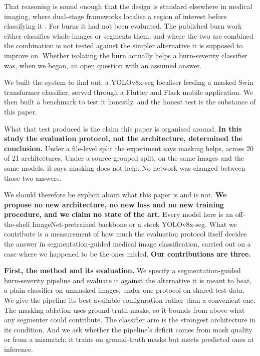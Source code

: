 \documentclass{melba}
\begin{document}
That reasoning is sound enough that the design is standard elsewhere in medical imaging, where dual-stage frameworks localise a region of interest before classifying it \citep{bruno,almasni2020}. For burns it had not been evaluated. The published burn work either classifies whole images or segments them, and where the two are combined the combination is not tested against the simpler alternative it is supposed to improve on. Whether isolating the burn actually helps a burn-severity classifier was, when we began, an open question with an assumed answer.

We built the system to find out: a YOLOv8x-seg localiser feeding a masked Swin transformer classifier, served through a Flutter and Flask mobile application. We then built a benchmark to test it honestly, and the honest test is the substance of this paper.

What that test produced is the claim this paper is organised around. \textbf{In this study the evaluation protocol, not the architecture, determined the conclusion.} Under a file-level split the experiment says masking helps, across 20 of 21 architectures. Under a source-grouped split, on the same images and the same models, it says masking does not help. No network was changed between those two answers.

We should therefore be explicit about what this paper is and is not. \textbf{We propose no new architecture, no new loss and no new training procedure, and we claim no state of the art.} Every model here is an off-the-shelf ImageNet-pretrained backbone or a stock YOLOv8x-seg. What we contribute is a measurement of how much the evaluation protocol itself decides the answer in segmentation-guided medical image classification, carried out on a case where we happened to be the ones misled. \textbf{Our contributions are three.}

\textbf{First, the method and its evaluation.} We specify a segmentation-guided burn-severity pipeline and evaluate it against the alternative it is meant to beat, a plain classifier on unmasked images, under one protocol on shared test data. We give the pipeline its best available configuration rather than a convenient one. The masking ablation uses ground-truth masks, so it bounds from above what any segmenter could contribute. The classifier arm is the strongest architecture in its condition. And we ask whether the pipeline's deficit comes from mask quality or from a mismatch: it trains on ground-truth masks but meets predicted ones at inference.
\end{document}
